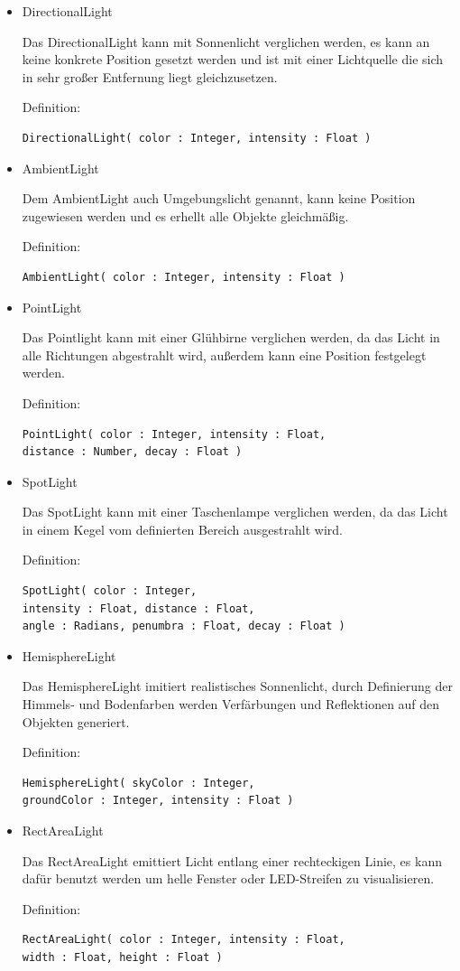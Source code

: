\begin{itemize}
  \item DirectionalLight
  
Das DirectionalLight kann mit Sonnenlicht verglichen werden, es kann an keine konkrete Position gesetzt werden und ist mit einer Lichtquelle die sich in sehr großer Entfernung liegt gleichzusetzen.

Definition:
\begin{lstlisting}
DirectionalLight( color : Integer, intensity : Float )
\end{lstlisting}
  \item AmbientLight 
  
Dem AmbientLight auch Umgebungslicht genannt, kann keine Position zugewiesen werden und es erhellt alle Objekte gleichmäßig.

Definition:
\begin{lstlisting}
AmbientLight( color : Integer, intensity : Float )
\end{lstlisting}
\newpage
\item PointLight
  
Das Pointlight kann mit einer Glühbirne verglichen werden, da das Licht in alle Richtungen abgestrahlt wird, außerdem kann eine Position festgelegt werden.

Definition:
\begin{lstlisting}
PointLight( color : Integer, intensity : Float, 
distance : Number, decay : Float )
\end{lstlisting}
\item SpotLight

Das SpotLight kann mit einer Taschenlampe verglichen werden, da das Licht in einem Kegel vom definierten Bereich ausgestrahlt wird. 

Definition:
\begin{lstlisting}
SpotLight( color : Integer, 
intensity : Float, distance : Float, 
angle : Radians, penumbra : Float, decay : Float )
\end{lstlisting}
  \item HemisphereLight
  
Das HemisphereLight imitiert realistisches Sonnenlicht, durch Definierung der Himmels- und Bodenfarben werden Verfärbungen und Reflektionen auf den Objekten generiert.

Definition:
\begin{lstlisting}
HemisphereLight( skyColor : Integer, 
groundColor : Integer, intensity : Float )
\end{lstlisting}
  \item RectAreaLight
  
Das RectAreaLight emittiert Licht entlang einer rechteckigen Linie, es kann dafür benutzt werden um helle Fenster oder LED-Streifen zu visualisieren.

Definition:
\begin{lstlisting}
RectAreaLight( color : Integer, intensity : Float, 
width : Float, height : Float )
\end{lstlisting}
\end{itemize}
\clearpage \newpage
